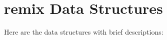 \section{remix Data Structures}
Here are the data structures with brief descriptions:\begin{CompactList}
\item{}
\end{CompactList}
